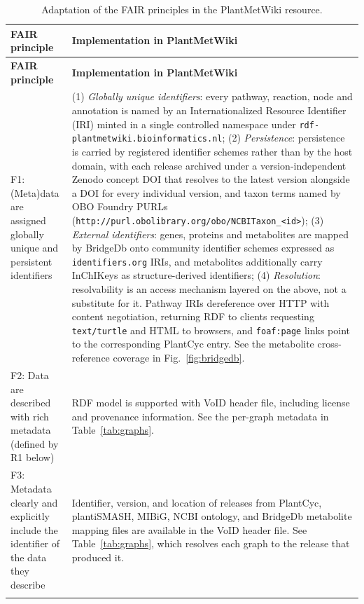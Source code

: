 \documentclass[11pt,a4paper]{article}
\newcommand{\rev}[1]{#1}
\begin{document}
{\footnotesize
\begin{longtable}{p{} p{}}
\caption{Adaptation of the FAIR principles in the PlantMetWiki resource.}
\label{tab:fair}\\
\toprule
\textbf{FAIR principle} & \textbf{Implementation in PlantMetWiki} \\
\midrule
\endfirsthead
\toprule
\textbf{FAIR principle} & \textbf{Implementation in PlantMetWiki} \\
\midrule
\endhead
\bottomrule
\endfoot
F1: (Meta)data are assigned globally unique and persistent identifiers &

(1) \textit{Globally unique identifiers}: every pathway, reaction, node and annotation is named
by an Internationalized Resource Identifier (IRI) minted in a single controlled namespace under
\texttt{rdf-\allowbreak{}plantmetwiki.\allowbreak{}bioinformatics.\allowbreak{}nl}; (2)
\textit{Persistence}: persistence is carried by registered identifier schemes rather than by the
host domain, with each release archived under a version-independent Zenodo concept DOI that resolves
to the latest version alongside a DOI for every individual version, and taxon terms named by OBO
Foundry PURLs
(\texttt{http://\allowbreak{}purl.\allowbreak{}obolibrary.\allowbreak{}org/\allowbreak{}obo/\allowbreak{}NCBITaxon\_\allowbreak{}<id>});
(3) \textit{External identifiers}: genes, proteins and metabolites are mapped by BridgeDb onto
community identifier schemes expressed as \texttt{identifiers.\allowbreak{}org} IRIs, and
metabolites additionally carry InChIKeys as structure-derived identifiers; (4) \textit{Resolution}:
resolvability is an access mechanism layered on the above, not a substitute for it. Pathway IRIs
dereference over HTTP with content negotiation, returning RDF to clients requesting
\texttt{text/turtle} and HTML to browsers, and \texttt{foaf:page} links point to the corresponding
PlantCyc entry.
\rev{See the metabolite cross-reference coverage in Fig.~\ref{fig:bridgedb}.} \\
\addlinespace
F2: Data are described with rich metadata (defined by R1 below) &
RDF model is supported with VoID header file, including license and provenance information.
\rev{See the per-graph metadata in Table~\ref{tab:graphs}.} \\
\addlinespace
F3: Metadata clearly and explicitly include the identifier of the data they describe &
Identifier, version, and location of releases from PlantCyc, plantiSMASH, MIBiG, NCBI ontology, and
BridgeDb metabolite mapping files are available in the VoID header file.
\rev{See Table~\ref{tab:graphs}, which resolves each graph to the release that produced
it.} \\
\addlinespace


\end{longtable}}
\end{document}
